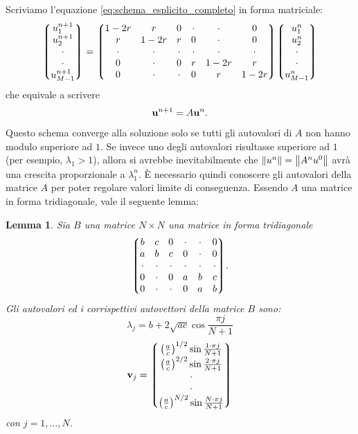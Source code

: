 \documentclass[10pt,a4paper]{article}
\newtheorem{lemma}[theorem]{Lemma}
\begin{document}
Scriviamo l'equazione \eqref{eq:schema_esplicito_completo} in forma matriciale:
\begin{equation}
	\mqty*(u_1^{n+1}\\u_2^{n+1}\\ \cdot \\ \cdot \\ u_{M-1}^{n+1}) = \mqty*(1-2r & r & 0 & \cdot & \cdot & 0 \\ r & 1-2r & r & 0 & \cdot & 0 \\ \cdot & \cdot & \cdot & \cdot & \cdot & \cdot \\ 0 & \cdot & 0 & r & 1-2r & r \\ 0 & \cdot & \cdot & 0 & r & 1 - 2r) \mqty*(u_1^{n}\\u_2^{n}\\ \cdot \\ \cdot \\ u_{M-1}^{n})
\end{equation}
che equivale a scrivere
\begin{equation}
	\vb{u}^{n+1} = A \vb{u}^n.
\end{equation}
Questo schema converge alla soluzione solo se tutti gli autovalori di $A$ non hanno modulo superiore ad $1$. Se invece uno degli autovalori risultasse superiore ad $1$ (per esempio, $\lambda_1 > 1$), allora si avrebbe inevitabilmente che $\norm{u^n} = \norm{A^n u^0}$ avrà una crescita proporzionale a $\lambda_1^n$. È necessario quindi conoscere gli autovalori della matrice $A$ per poter regolare valori limite di conseguenza. Essendo $A$ una matrice in forma tridiagonale, vale il seguente lemma:

\begin{lemma}
	\label{lem:tridiagonale}
	Sia $B$ una matrice $N \times N$ una matrice in forma tridiagonale
	\begin{equation}
		\mqty*(b & c & 0 & \cdot & \cdot & 0 \\ a & b & c & 0 & \cdot & 0 \\ \cdot & \cdot & \cdot & \cdot & \cdot & \cdot \\ 0 & \cdot & 0 & a & b & c \\ 0 & \cdot & \cdot & 0 & a & b).
	\end{equation}
	Gli autovalori ed i corrispettivi autovettori della matrice $B$ sono:
	\begin{equation}
		\lambda_j = b+2\sqrt{ac} \cos{\frac{\pi j}{N+1}}
	\end{equation}
	\begin{equation}
		\vb{v}_j = \mqty*(\left(\frac{a}{c}\right)^{1/2}\sin{\frac{1\cdot\pi j}{N+1}} \\ \left(\frac{a}{c}\right)^{2/2}\sin{\frac{2\cdot\pi j}{N+1}} \\ \cdot \\ \cdot \\ \left(\frac{a}{c}\right)^{N/2}\sin{\frac{N\cdot\pi j}{N+1}})
	\end{equation}
	con $j = 1,\ldots, N$.
\end{lemma}
\end{document}
